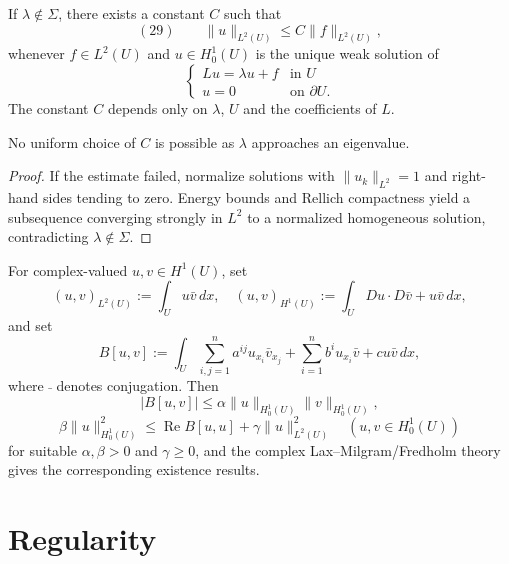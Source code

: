 \begin{theorem}
\label{thm:boundedness-of-inverse}

If $\lambda \notin \Sigma$, there exists a constant $C$ such that
$$(29) \qquad \|u\|_{L^2(U)} \leq C\|f\|_{L^2(U)},$$
whenever $f \in L^2(U)$ and $u \in H_0^1(U)$ is the unique weak solution of
$$\begin{cases} Lu = \lambda u + f & \text{in } U \\ u = 0 & \text{on } \partial U. \end{cases}$$
The constant $C$ depends only on $\lambda$, $U$ and the coefficients of $L$.

No uniform choice of $C$ is possible as $\lambda$ approaches an eigenvalue.
\end{theorem}

\begin{proof}
\sketch If the estimate failed, normalize solutions with $\|u_k\|_{L^2}=1$ and right-hand sides tending to zero. Energy bounds and Rellich compactness yield a subsequence converging strongly in $L^2$ to a normalized homogeneous solution, contradicting $\lambda\notin\Sigma$.
\end{proof}

\begin{remark}
\label{rem:complex-valued-weak-solutions}

For complex-valued $u,v\in H^1(U)$, set
$$(u,v)_{L^2(U)} := \int_U u\bar v\,dx, \quad (u,v)_{H^1(U)} := \int_U Du \cdot D\bar v + u\bar v\,dx,$$
and set
$$B[u,v] := \int_U \sum_{i,j=1}^n a^{ij}u_{x_i}\bar v_{x_j} + \sum_{i=1}^n b^iu_{x_i}\bar v + cu\bar v\,dx,$$
where $\bar{\ }$ denotes conjugation. Then
$$|B[u,v]| \leq \alpha\|u\|_{H_0^1(U)}\|v\|_{H_0^1(U)},$$
$$\beta\|u\|_{H_0^1(U)}^2 \leq \operatorname{Re}B[u,u] + \gamma\|u\|_{L^2(U)}^2 \quad (u,v \in H_0^1(U))$$
for suitable $\alpha,\beta>0$ and $\gamma\ge0$, and the complex Lax--Milgram/Fredholm theory gives the corresponding existence results.
\end{remark}

\section{Regularity}
\label{sec:elliptic-regularity}

